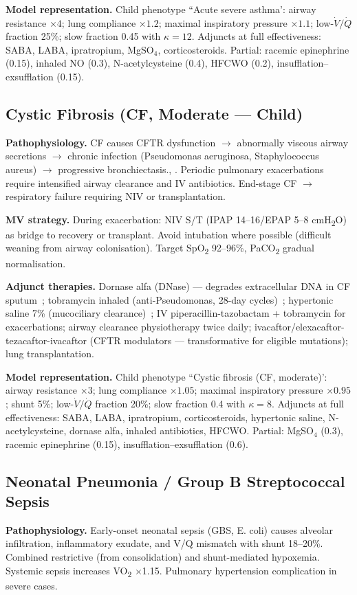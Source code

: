 \textbf{Model representation.} Child phenotype ``Acute severe asthma': airway resistance $\times4$; lung compliance $\times1.2$; maximal inspiratory pressure $\times1.1$; low-$\dot V/\dot Q$ fraction 25\%; slow fraction 0.45 with $\kappa=12$. Adjuncts at full effectiveness: SABA, LABA, ipratropium, MgSO$_4$, corticosteroids. Partial: racemic epinephrine (0.15), inhaled NO (0.3), N-acetylcysteine (0.4), HFCWO (0.2), insufflation--exsufflation (0.15).

\subsection{Cystic Fibrosis (CF, Moderate --- Child)}
\textbf{Pathophysiology.} CF causes CFTR dysfunction $\to$ abnormally viscous airway secretions $\to$ chronic infection (Pseudomonas aeruginosa, Staphylococcus aureus) $\to$ progressive bronchiectasis., . Periodic pulmonary exacerbations require intensified airway clearance and IV antibiotics. End-stage CF $\to$ respiratory failure requiring NIV or transplantation.

\textbf{MV strategy.} During exacerbation: NIV S/T (IPAP 14--16/EPAP 5--8 cmH\textsubscript{2}O) as bridge to recovery or transplant. Avoid intubation where possible (difficult weaning from airway colonisation). Target SpO\textsubscript{2} 92--96\%, PaCO\textsubscript{2} gradual normalisation.

\textbf{Adjunct therapies.} Dornase alfa (DNase) --- degrades extracellular DNA in CF sputum~\citep{fuchs1994}; tobramycin inhaled (anti-Pseudomonas, 28-day cycles)~\citep{ramsey1999}; hypertonic saline 7\% (mucociliary clearance)~\citep{donaldson2006}; IV piperacillin-tazobactam + tobramycin for exacerbations; airway clearance physiotherapy twice daily; ivacaftor/elexacaftor-tezacaftor-ivacaftor (CFTR modulators --- transformative for eligible mutations); lung transplantation.

\textbf{Model representation.} Child phenotype ``Cystic fibrosis (CF, moderate)': airway resistance $\times3$; lung compliance $\times1.05$; maximal inspiratory pressure $\times0.95$; shunt 5\%; low-$\dot V/\dot Q$ fraction 20\%; slow fraction 0.4 with $\kappa=8$. Adjuncts at full effectiveness: SABA, LABA, ipratropium, corticosteroids, hypertonic saline, N-acetylcysteine, dornase alfa, inhaled antibiotics, HFCWO. Partial: MgSO$_4$ (0.3), racemic epinephrine (0.15), insufflation--exsufflation (0.6).

\subsection{Neonatal Pneumonia / Group B Streptococcal Sepsis}
\textbf{Pathophysiology.} Early-onset neonatal sepsis (GBS, E. coli) causes alveolar infiltration, inflammatory exudate, and V/Q mismatch with shunt 18--20\%. Combined restrictive (from consolidation) and shunt-mediated hypoxemia. Systemic sepsis increases VO\textsubscript{2} $\times$1.15. Pulmonary hypertension complication in severe cases.


